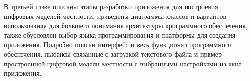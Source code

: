 В третьей главе описаны этапы разработки приложения для построения цифровых моделей местности, приведены диаграммы классов и вариантов использования для большего понимания архитектуры программного обеспечения, также обусловлен выбор языка программирования и платформы для создания приложения. Подробно описан интерфейс и весь функционал программного обеспечения, ньюансы связанные с загрузкой текстового файла и пример простроенной цифровой модели местности с выбранными настройками из окна приложения.
